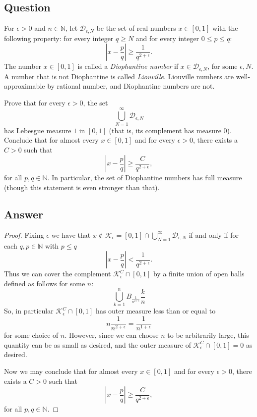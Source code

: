 \documentclass[12pt]{article}
\begin{document}
\subsection{Question}
For $\epsilon>0$ and $n \in \mathbb{N}$, let $\mathcal{D}_{\epsilon, N}$ be the set of real numbers $x \in [0,1]$ with the following property: for every integer $q \geq N$ and for every integer $0 \leq p \leq q$:
\[\left| x-\frac{p}{q} \right| \geq \frac{1}{q^{2+\epsilon}}.\]
The number $x \in [0,1]$ is called a \emph{Diophantine number} if $x \in \mathcal{D}_{\epsilon, N}$, for some $\epsilon, N$. A number that is not Diophantine is called \emph{Liouville}. Liouville numbers are well-approximable by rational number, and Diophantine numbers are not.

Prove that for every $\epsilon > 0 $, the set
\[\bigcup_{N=1}^\infty \mathcal{D}_{\epsilon, N}\]
has Lebesgue measure $1$ in $[0,1]$ (that is, its complement has measure 0). Conclude that for almost every $x \in [0,1]$ and for every $\epsilon >0$, there exists a $C > 0$ such that 
\[\left| x-\frac{p}{q} \right| \geq \frac{C}{q^{2+\epsilon}},\]
for all $p,q \in \mathbb{N}$. In particular, the set of Diophantine numbers has full measure (though this statement is even stronger than that).
\subsection{Answer}
\begin{proof}
Fixing $\epsilon$ we have that $x \notin \mathcal{K}_\epsilon = [0,1] \cap \bigcup_{N=1}^\infty \mathcal{D}_{\epsilon, N}$ if and only if for each $q,p \in \mathbb{N}$ with $p \leq q$
\[\left| x-\frac{p}{q} \right| < \frac{1}{q^{2+\epsilon}}.\]
Thus we can cover the complement $\mathcal{K}^C_\epsilon \cap [0,1]$ by a finite union of open balls defined as follows for some $n$: 
\[\bigcup_{k=1}^n B_{\frac{1}{n^{2+\epsilon}}} \frac{k}{n}\]
So, in particular $\mathcal{K}^C_\epsilon \cap [0,1]$ has outer measure less than or equal to 
\[n \frac{1}{n^{2+\epsilon}} = \frac{1}{n^{1+\epsilon}}\]
for some choice of $n$. However, since we can choose $n$ to be arbitrarily large, this quantity can be as small as desired, and the outer measure of $\mathcal{K}_\epsilon^C\cap[0,1]=0$ as desired.

Now we may conclude that for almost every $x \in [0,1]$ and for every $\epsilon >0$, there exists a $C > 0$ such that 
\[\left| x-\frac{p}{q} \right| \geq \frac{C}{q^{2+\epsilon}},\]
for all $p,q \in \mathbb{N}$.
\end{proof}
\end{document}
